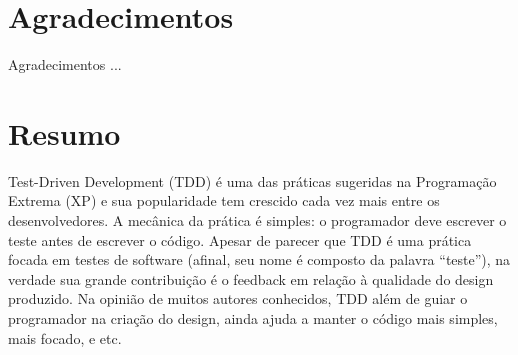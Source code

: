 \documentclass[11pt,twoside,a4paper]{book}
\begin{document}




    
      


\chapter*{Agradecimentos}
Agradecimentos ...

\chapter*{Resumo}

Test-Driven Development (TDD) é uma das práticas sugeridas na Programação
Extrema (XP) e sua popularidade tem crescido cada vez mais entre os
desenvolvedores.
A mecânica da prática é simples: o programador deve escrever o teste antes
de escrever o código. Apesar de parecer que TDD é uma prática focada em testes
de software (afinal, seu nome é composto da palavra ``teste''), na verdade sua
grande contribuição é o feedback em relação à qualidade do design produzido.
Na opinião de muitos autores conhecidos, TDD além de guiar o programador na
criação do design, ainda ajuda a manter o código mais simples,
mais focado, e etc.
\end{document}
